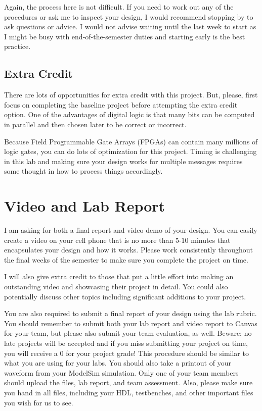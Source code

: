\documentclass{article}
\begin{document}
Again, the process here is not difficult.  If you need to work out any
of the procedures or ask me to inspect your design, I would recommend
stopping by to ask questions or advice.  I would not advise waiting
until the last week to start as I might be busy with
end-of-the-semester duties and starting early is the best practice.

\subsection{Extra Credit}

There are lots of opportunities for extra credit with this project.
But, please, first focus on completing the baseline project before
attempting the extra credit option.  One of the advantages of digital
logic is that many bits can be computed in parallel and then chosen
later to be correct or incorrect.

Because Field Programmable Gate Arrays
(FPGAs) can contain many millions of logic gates, you can do lots of
optimization for this project.  Timing is challenging in this lab and
making sure your design works for multiple messages requires some
thought in how to process things accordingly.

\section{Video and Lab Report}

I am asking for
both a final report and video demo of your design.  You can easily
create a video on your cell phone that is no more than $5$-$10$ minutes
that encapsulates your design and how it works.  Please work
consistently throughout the final weeks of the semester to make sure
you complete the project on time.

I will also give extra credit to those that put a little effort into
making an outstanding video and showcasing their project in detail.
You could also potentially discuss other topics including significant
additions to your project.

You are also required to submit a final report of your design using
the lab rubric.  You should remember to submit both your lab report
and video report to Canvas for
your team, but please also submit your team evaluation, as well.
Beware; no
late projects will be accepted and if you miss submitting your project
on time, you will receive a $0$ for your project grade!  This
procedure should be similar to what you are using for your labs.
You should also take a printout of your waveform 
from your ModelSim simulation.  
Only one of your team members should upload
the files, lab report, and team assessment.  Also, please make sure you
hand in all files, including your HDL, testbenches, and other
important files you wish for us to see.
\end{document}
